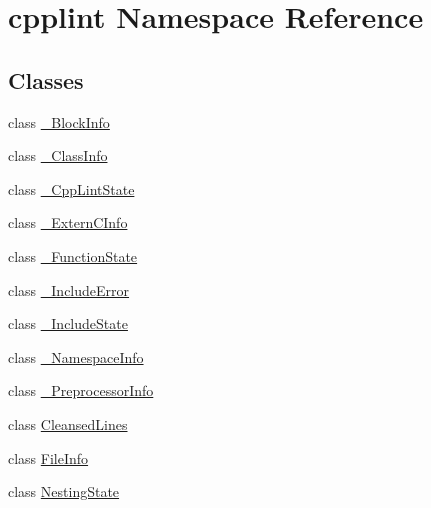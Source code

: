 \hypertarget{namespacecpplint}{}\section{cpplint Namespace Reference}
\label{namespacecpplint}
\subsection*{Classes}
\begin{DoxyCompactItemize}
\item 
class \hyperlink{classcpplint_1_1___block_info}{\+\_\+\+Block\+Info}
\item 
class \hyperlink{classcpplint_1_1___class_info}{\+\_\+\+Class\+Info}
\item 
class \hyperlink{classcpplint_1_1___cpp_lint_state}{\+\_\+\+Cpp\+Lint\+State}
\item 
class \hyperlink{classcpplint_1_1___extern_c_info}{\+\_\+\+Extern\+C\+Info}
\item 
class \hyperlink{classcpplint_1_1___function_state}{\+\_\+\+Function\+State}
\item 
class \hyperlink{classcpplint_1_1___include_error}{\+\_\+\+Include\+Error}
\item 
class \hyperlink{classcpplint_1_1___include_state}{\+\_\+\+Include\+State}
\item 
class \hyperlink{classcpplint_1_1___namespace_info}{\+\_\+\+Namespace\+Info}
\item 
class \hyperlink{classcpplint_1_1___preprocessor_info}{\+\_\+\+Preprocessor\+Info}
\item 
class \hyperlink{classcpplint_1_1_cleansed_lines}{Cleansed\+Lines}
\item 
class \hyperlink{classcpplint_1_1_file_info}{File\+Info}
\item 
class \hyperlink{classcpplint_1_1_nesting_state}{Nesting\+State}
\end{DoxyCompactItemize}
